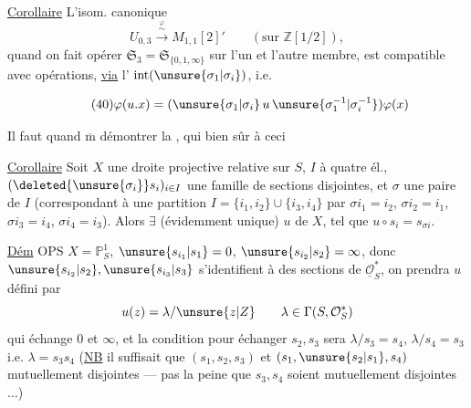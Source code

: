 \uline{Corollaire} L'isom. canonique
\[
U_{0,3}\xrightarrow{\overset{\varphi}{\sim}}M_{1,1}[2]'
\qquad (\text{sur }\mathbb Z[1/2]),
\]
quand on fait opérer $\mathfrak{S}_3=\mathfrak{S}_{\{0,1,\infty\}}$ sur
l'un et l'autre membre, est compatible
avec  opérations, \uline{via} l' $\operatorname{int}(\unsure{\sigma_1|\sigma_i})$, i.e.


\[
\tag{40}
\varphi(u.x)=(\unsure{\sigma_1|\sigma_i}\,u\,\unsure{\sigma_1^{-1}|\sigma_i^{-1}})\varphi(x)
\]

Il faut quand $\overline{\mathrm m}$ démontrer la ,
qui  bien sûr à ceci

\uline{Corollaire} Soit $X$ une droite projective
relative sur  $S$, $I$  à quatre él.,
$(\deleted{\unsure{\sigma_i}}s_i)_{i\in I}$ une famille de sections 
disjointes, et $\sigma$ une  paire de
$I$ (correspondant à une partition $I=\{i_1,i_2\}\cup\{i_3,i_4\}$
par $\sigma i_1=i_2$, $\sigma i_2=i_1$, $\sigma i_3=i_4$, $\sigma i_4=i_3$). Alors $\exists$
 (évidemment unique) $u$ de $X$,
tel que $u\circ s_i=s_{\sigma i}$.

\uline{Dém} OPS $X=\mathbb P^1_S$, $\unsure{s_{i_1}|s_1}=0$, $\unsure{s_{i_2}|s_2}=\infty$, donc
$\unsure{s_{i_2}|s_2},\unsure{s_{i_3}|s_3}$ s'identifient à des sections de
$\underline{\mathcal O}_S^*$, on prendra  $u$ défini par
\[
u(z)=\lambda/\unsure{z|Z}\qquad\lambda\in\Gamma(S,\mathcal O_S^*)
\]
qui échange $0$ et $\infty$, et la condition
pour échanger $s_2,s_3$ sera $\lambda/s_3=s_4$, $\lambda/s_4=s_3$
i.e. $\lambda=s_3s_4$ (\uline{NB} il suffisait que
$(s_1,s_2,s_3)$ et $(s_1,\unsure{s_2|s_1},s_4)$  mutuellement disjointes ---
pas la peine que $s_3,s_4$ soient mutuellement
disjointes $\ldots$)



